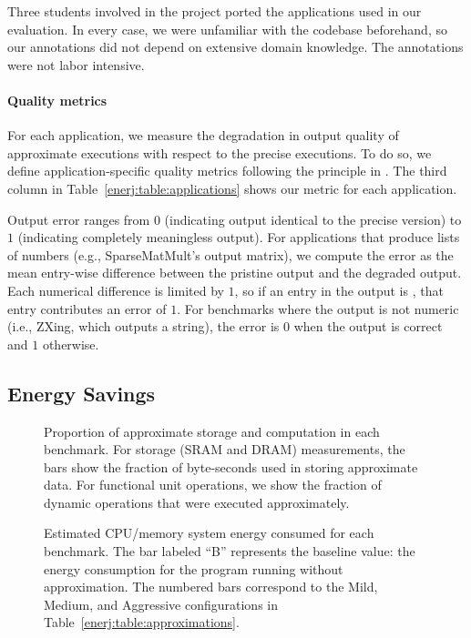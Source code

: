 Three students involved in the project
ported the applications used in our
evaluation. In every case, we were unfamiliar with the codebase
beforehand, so our annotations did not depend on extensive domain
knowledge. The annotations were not labor intensive.


\paragraph{Quality metrics}
For each application, we measure the
degradation in output quality of approximate executions with respect
to the precise executions. To do so, we define application-specific
quality metrics following the principle in .
The third column in
Table~\ref{enerj:table:applications} shows our metric for each application.

Output error ranges from $0$ (indicating output identical to the
precise version) to $1$ (indicating completely meaningless output). For
applications that produce lists of numbers (e.g., SparseMatMult's output
matrix), we compute the error as the mean entry-wise difference between the
pristine output and the degraded output. Each numerical difference is limited
by $1$, so if an entry in the output is ,
that entry contributes an error of $1$. For benchmarks where the output is not
numeric (i.e., ZXing, which outputs a string), the error is $0$ when the output
is correct and $1$ otherwise. %


\subsection{Energy Savings}

\begin{figure}
\center
\sffamily

\caption{Proportion of approximate storage and computation in each benchmark.
For storage (SRAM and DRAM) measurements, the bars
show the fraction of byte-seconds used in storing approximate data.
For functional unit operations, we show the fraction of dynamic operations
that were executed approximately.}
\label{enerj:fig:approximateness}
\end{figure}

\begin{figure}
\center
\sffamily

\caption{Estimated CPU/memory system energy consumed for
each benchmark. The bar labeled ``B'' represents the baseline value:
the energy consumption for the program running without approximation.
The numbered bars correspond to the Mild, Medium, and Aggressive
configurations in Table~\ref{enerj:table:approximations}.}
\label{enerj:fig:energy}
\end{figure}


